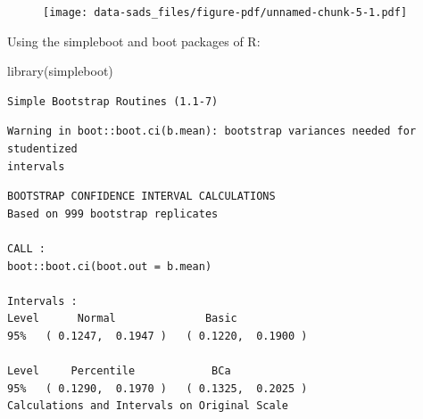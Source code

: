 \documentclass[
  letterpaper,
]{book}
\newenvironment{Shaded}{\begin{snugshade}}{\end{snugshade}}
\newcommand{\DecValTok}[1]{\textcolor[rgb]{0.68,0.00,0.00}{#1}}
\newcommand{\FunctionTok}[1]{\textcolor[rgb]{0.28,0.35,0.67}{#1}}
\newcommand{\NormalTok}[1]{\textcolor[rgb]{0.00,0.23,0.31}{#1}}
\newcommand{\OtherTok}[1]{\textcolor[rgb]{0.00,0.23,0.31}{#1}}
\newcommand{\SpecialCharTok}[1]{\textcolor[rgb]{0.37,0.37,0.37}{#1}}
\begin{document}
\begin{figure}[H]

{\centering \texttt{[image: data-sads\_files/figure-pdf/unnamed-chunk-5-1.pdf]}

}

\end{figure}

Using the simpleboot and boot packages of R:

\begin{Shaded}
\begin{Highlighting}[]
\FunctionTok{library}\NormalTok{(simpleboot)}
\end{Highlighting}
\end{Shaded}

\begin{verbatim}
Simple Bootstrap Routines (1.1-7)
\end{verbatim}

\begin{Shaded}
\end{Shaded}

\begin{verbatim}
Warning in boot::boot.ci(b.mean): bootstrap variances needed for studentized
intervals
\end{verbatim}

\begin{verbatim}
BOOTSTRAP CONFIDENCE INTERVAL CALCULATIONS
Based on 999 bootstrap replicates

CALL : 
boot::boot.ci(boot.out = b.mean)

Intervals : 
Level      Normal              Basic         
95%   ( 0.1247,  0.1947 )   ( 0.1220,  0.1900 )  

Level     Percentile            BCa          
95%   ( 0.1290,  0.1970 )   ( 0.1325,  0.2025 )  
Calculations and Intervals on Original Scale
\end{verbatim}

\begin{Shaded}
\end{Shaded}
\end{document}
